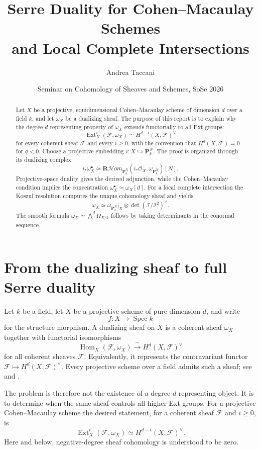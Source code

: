 \documentclass[11pt,a4paper]{article}
\title{Serre Duality for Cohen--Macaulay Schemes\\
       and Local Complete Intersections}
\author{Andrea Taccani}
\date{Seminar on Cohomology of Sheaves and Schemes, SoSe 2026}
\theoremstyle{definition}
\theoremstyle{remark}
\newcommand{\OO}{\mathcal O}
\newcommand{\II}{\mathcal I}
\newcommand{\FF}{\mathcal F}
\newcommand{\PP}{\mathbf P}
\newcommand{\Spec}{\operatorname{Spec}}
\newcommand{\Hom}{\operatorname{Hom}}
\newcommand{\Ext}{\operatorname{Ext}}
\newcommand{\RshHom}{\mathbf R\!\mathcal H\!om}
\newcommand{\dual}{^{\vee}}
\newcommand{\determinant}{\operatorname{det}}
\begin{document}
\maketitle

\begin{abstract}
Let $X$ be a projective, equidimensional Cohen--Macaulay scheme of dimension
$d$ over a field $k$, and let $\omega_X$ be a dualizing sheaf. The purpose of
this report is to explain why the degree-$d$ representing property of
$\omega_X$ extends functorially to all Ext groups:
\[
  \Ext_X^i(\FF,\omega_X)\simeq H^{d-i}(X,\FF)\dual
\]
for every coherent sheaf $\FF$ and every $i\geq0$, with the convention that
$H^q(X,\FF)=0$ for $q<0$. Choose a projective embedding
$i:X\hookrightarrow\PP^N_k$. The proof is organized through its dualizing complex
\[
  i_*\omega_X^\bullet
  \simeq\RshHom_{\PP^N_k}(i_*\OO_X,\omega_{\PP^N_k})[N].
\]
Projective-space duality gives the derived adjunction, while the Cohen--Macaulay condition implies the concentration $\omega_X^\bullet\simeq\omega_X[d]$. For a local complete intersection the Koszul resolution computes the unique cohomology sheaf and yields
\[
  \omega_X\simeq
  \omega_{\PP^N_k}|_X\otimes\determinant(\II/\II^2)\dual.
\]
The smooth formula $\omega_X\simeq\bigwedge^d\Omega_{X/k}$ follows by taking determinants in the conormal sequence.
\end{abstract}

\tableofcontents

\section{From the dualizing sheaf to full Serre duality}

Let $k$ be a field, let $X$ be a projective scheme of pure dimension $d$, and write
\[
  f:X\longrightarrow \Spec k
\]
for the structure morphism. A dualizing sheaf on $X$ is a coherent sheaf $\omega_X$ together with functorial isomorphisms
\begin{equation}\label{eq:dualizing-sheaf-definition}
  \Hom_X(\FF,\omega_X)\xrightarrow{\ \sim\ }H^d(X,\FF)\dual
\end{equation}
for all coherent sheaves $\FF$. Equivalently, it represents the contravariant functor $\FF\mapsto H^d(X,\FF)\dual$. Every projective scheme over a field admits such a sheaf; see
\cite[Chapter III, Proposition 7.5]{HartshorneAG} and
\cite[Tag 0FVV]{Stacks}.

The problem is therefore not the existence of a degree-$d$ representing
object. It is to determine when the same sheaf controls all higher Ext
groups. For a projective Cohen--Macaulay scheme the desired statement, for a
coherent sheaf $\FF$ and $i\geq0$, is
\begin{equation}\label{eq:target-duality}
  \Ext_X^i(\FF,\omega_X)\simeq H^{d-i}(X,\FF)\dual.
\end{equation}
Here and below, negative-degree sheaf cohomology is understood to be zero.
\end{document}
